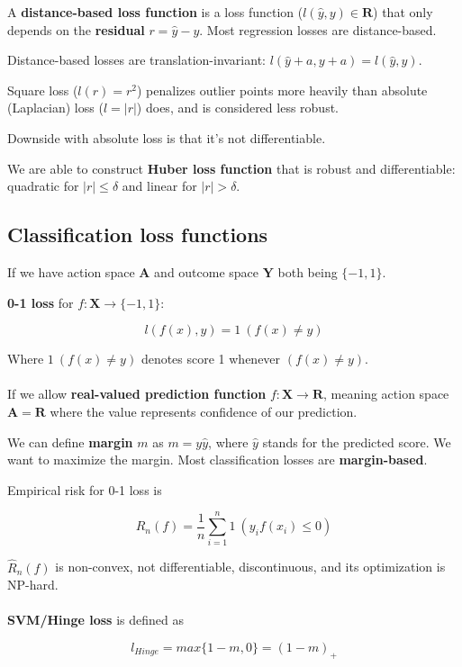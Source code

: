 \documentclass{article}
\begin{document}
A \textbf{distance-based loss function} is a loss function ($\mathit{l}(\hat{y}, y) \in \mathbf{R}$) that only depends on the \textbf{residual} $r = \hat{y} - y$.
Most regression losses are distance-based.

Distance-based losses are translation-invariant: $\mathit{l}(\hat{y} + a, y + a) = \mathit{l}(\hat{y}, y)$.

Square loss ($\mathit{l}(r) = r^2$) penalizes outlier points more heavily than absolute (Laplacian) loss ($\mathit{l} = |r|$) does, and is considered less robust.

Downside with absolute loss is that it's not differentiable.

We are able to construct \textbf{Huber loss function} that is robust and differentiable: quadratic for $|r| \leq \delta$ and linear for $|r| > \delta$.

\subsection{Classification loss functions}

If we have action space $\mathbf{A}$ and outcome space $\mathbf{Y}$ both being $\{-1, 1\}$.

\textbf{0-1 loss} for $f: \mathbf{X} \to \{-1, 1\}$:

$$
\mathit{l}(f(x), y) = 1 ~ (f(x) \neq y)
$$

Where $1 ~ (f(x) \neq y)$ denotes score 1 whenever $(f(x) \neq y)$.
\\
\\
If we allow \textbf{real-valued prediction function} $f : \mathbf{X} \to \mathbf{R}$, meaning action space $\mathbf{A} = \mathbf{R}$ where the value represents confidence of our prediction.

We can define \textbf{margin} $m$ as $m = y \hat{y}$, where $\hat{y}$ stands for the predicted score.
We want to maximize the margin.
Most classification losses are \textbf{margin-based}.

Empirical risk for 0-1 loss is

$$
\hat{R}_n(f) = \frac{1}{n} \sum_{i = 1}^{n}{1}~(y_i f(x_i) \leq 0)
$$

$\hat{R}_n(f)$ is non-convex, not differentiable, discontinuous, and its optimization is NP-hard.
\\
\\
\textbf{SVM/Hinge loss} is defined as

$$
\mathit{l}_{Hinge} = max\{ 1 - m, 0 \} = (1 - m)_+
$$
\end{document}
